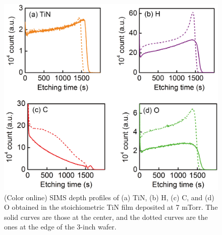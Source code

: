 \documentclass{report}
\begin{document}
\begin{figure}
\begin{center}
\includegraphics{InPlaneDist-SIMS.jpg}
\end{center}
\caption{(Color online) SIMS depth profiles of (a) TiN, (b) H, (c) C, and (d) O obtained in the stoichiometric TiN film deposited at 7 mTorr. The solid curves are those at the center, and the dotted curves are the ones at the edge of the 3-inch wafer.}
\label{InPlaneDist-SIMS}
\end{figure}
\end{document}
